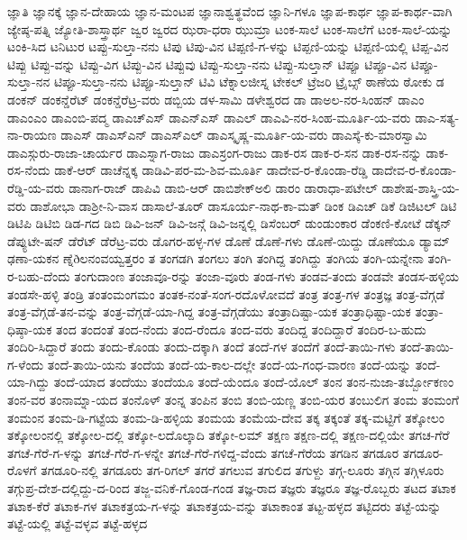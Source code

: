 ಜ್ಞಾತಿ
ಜ್ಞಾನಕ್ಕೆ
ಜ್ಞಾನ-ದೇಹಾಯ
ಜ್ಞಾನ-ಮಂಟಪ
ಜ್ಞಾನಾಶ್ವತ್ಥವೆಂದ
ಜ್ಞಾನಿ-ಗಳೂ
ಜ್ಞಾಪ-ಕಾರ್ಥ
ಜ್ಞಾಪ-ಕಾರ್ಥ-ವಾಗಿ
ಜ್ಯೇಷ್ಠ-ಪತ್ನಿ
ಜ್ಯೋತಿ-ಶಾಸ್ತ್ರಾರ್ಥ
ಜ್ವರ
ಜ್ವರದ
ಝರಾ-ಧರಾ
ಝುಮ್ರಾ
ಟಂಕ-ಸಾಲೆ
ಟಂಕ-ಸಾಲೆಗೆ
ಟಂಕ-ಸಾಲೆ-ಯನ್ನು
ಟಂಕಿ-ಸಿದ
ಟನಿಟುರ
ಟಪ್ಪು-ಸುಲ್ತಾ-ನನು
ಟಿಪು
ಟಿಪು-ವಿನ
ಟಿಪ್ಪಣಿ-ಗ-ಳನ್ನು
ಟಿಪ್ಪಣಿ-ಯನ್ನು
ಟಿಪ್ಪಣಿ-ಯಲ್ಲಿ
ಟಿಪ್ಪ-ವಿನ
ಟಿಪ್ಪು
ಟಿಪ್ಪು-ವನ್ನು
ಟಿಪ್ಪು-ವಿಗ
ಟಿಪ್ಪು-ವಿನ
ಟಿಪ್ಪುವು
ಟಿಪ್ಪು-ಸುಲ್ತಾ-ನನು
ಟಿಪ್ಪು-ಸುಲ್ತಾನ್
ಟಿಪ್ಪೂ
ಟಿಪ್ಪೂ-ವಿನ
ಟಿಪ್ಪೂ-ಸುಲ್ತಾ-ನನ
ಟಿಪ್ಪೂ-ಸುಲ್ತಾ-ನನು
ಟಿಪ್ಪೂ-ಸುಲ್ತಾನ್
ಟಿವಿ
ಟೆಕ್ನಾಲಜೀಸ್ನ
ಟೇಕಲ್
ಟ್ರೆಜರಿ
ಟ್ರೈಬ್ಸ್
ಠಾಣೆಯ
ಠೋಕು
ಡ
ಡಂಕನ್
ಡಂಕನ್ಡೆರೆಟ್
ಡಂಕನ್ಡೆರೆಟ್ರ-ವರು
ಡಬ್ಬಿಯ
ಡಳ-ಸಾಮಿ
ಡಳೇಶ್ವರದ
ಡಾ
ಡಾಅಲ-ನರ-ಸಿಂಹನ್
ಡಾಎಂ
ಡಾಎಂಎಂ
ಡಾಎಂಬಿ-ಪದ್ಮ
ಡಾಎಚ್ಎಸ್
ಡಾಎನ್ಎಸ್
ಡಾಎಲ್
ಡಾಎವಿ-ನರ-ಸಿಂಹ-ಮೂರ್ತಿ-ಯ-ವರು
ಡಾಎ-ಸತ್ಯ-ನಾ-ರಾಯಣ
ಡಾಎಸ್
ಡಾಎಸ್ಎನ್
ಡಾಎಸ್ಎಲ್
ಡಾಎಸ್ಕೃಷ್ಣ-ಮೂರ್ತಿ-ಯ-ವರು
ಡಾಎಸ್ಕೆ-ಕು-ಮಾರಸ್ವಾಮಿ
ಡಾಎಸ್ಗುರು-ರಾಜಾ-ಚಾರ್ಯರ
ಡಾಎಸ್ನಾಗ-ರಾಜು
ಡಾಎಸ್ರಂಗ-ರಾಜು
ಡಾಕ-ರಸ
ಡಾಕ-ರ-ಸನ
ಡಾಕ-ರಸ-ನನ್ನು
ಡಾಕ-ರಸ-ನೆಂದು
ಡಾಕೆ-ಆರ್
ಡಾಚೆನ್ನಕ್ಕ
ಡಾಡಿವಿ-ಪರ-ಮ-ಶಿವ-ಮೂರ್ತಿ
ಡಾದೇವ-ರ-ಕೊಂಡಾ-ರೆಡ್ಡಿ
ಡಾದೇವ-ರ-ಕೊಂಡಾ-ರೆಡ್ಡಿ-ಯ-ವರು
ಡಾನಾಗ-ರಾಜ್
ಡಾಪಿವಿ
ಡಾಬಿ-ಆರ್
ಡಾಬಿಶೇಕ್ಅಲಿ
ಡಾರಂ
ಡಾರಾಧಾ-ಪಟೇಲ್
ಡಾಶೇಷ-ಶಾಸ್ತ್ರಿ-ಯ-ವರು
ಡಾಶೋಭಾ
ಡಾಶ್ರೀ-ನಿ-ವಾಸ
ಡಾಸಾಲೆ-ತೂರ್
ಡಾಸೂರ್ಯ-ನಾಥ-ಕಾ-ಮತ್
ಡಿಂಕ
ಡಿಎಚ್
ಡಿಕೆ
ಡಿಜಿಟಲ್
ಡಿಟಿ
ಡಿಟಿಪಿ
ಡಿಟಿಬಿ
ಡಿಡ-ಗದ
ಡಿಬಿ
ಡಿವಿ-ಜನ್
ಡಿವಿ-ಜನ್ಗೆ
ಡಿವಿ-ಜನ್ನಲ್ಲಿ
ಡಿಸೆಂಬರ್
ಡುಂಡುಂಕಾರ
ಡೆಂಕಣಿ-ಕೋಟೆ
ಡೆಕ್ಕನ್
ಡೆಪ್ಯುಟೇ-ಷನ್
ಡೆರೆಟ್
ಡೆರೆಟ್ರ-ವರು
ಡೊಗರ-ಹಳ್ಳ-ಗಳ
ಡೊಣೆ
ಡೊಣೆ-ಗಳು
ಡೊಣೆ-ಯಿದ್ದು
ಡೊಣೆಯೂ
ಡ್ಯಾಮ್
ಢಣಾ-ಯಕನ
ಣ್ನೆðಲನಂವಯ್ವತ್ತರಂ
ತ
ತಂಗಡಗಿ
ತಂಗಲು
ತಂಗಿ
ತಂಗಿದ್ದ
ತಂಗಿದ್ದು
ತಂಗಿಯ
ತಂಗಿ-ಯನ್ನೇನಾ
ತಂಗಿ-ರ-ಬಹು-ದೆಂದು
ತಂಗುದಾಂಣ
ತಂಜಾವೂ-ರನ್ನು
ತಂಜಾ-ವೂರು
ತಂಡ-ಗಳು
ತಂಡವ-ತಂದು
ತಂಡವೇ
ತಂಡಸ-ಹಳ್ಳಿಯ
ತಂಡಸೇ-ಹಳ್ಳಿ
ತಂಡ್ರಿ
ತಂತಂಮಂಗಮಂ
ತಂತಕ-ನಂತೆ-ಸಂಗ-ರದೊಳೋವದೆ
ತಂತ್ರ
ತಂತ್ರ-ಗಳ
ತಂತ್ರಜ್ಞ
ತಂತ್ರ-ವೆಗ್ಗಡೆ
ತಂತ್ರ-ವೆಗ್ಗಡೆ-ತನ-ವನ್ನು
ತಂತ್ರ-ವೆಗ್ಗಡೆ-ಯಾ-ಗಿದ್ದ
ತಂತ್ರ-ವೆಗ್ಗಡೆಯು
ತಂತ್ರಾದಿಷ್ಟಾ-ಯಕ
ತಂತ್ರಾಧಿಷ್ಟಾ-ಯಕ
ತಂತ್ರಾ-ಧಿಷ್ಠಾ-ಯಕ
ತಂದ
ತಂದಂತೆ
ತಂದ-ನೆಂದು
ತಂದ-ರೆಂದೂ
ತಂದ-ವರು
ತಂದಿದ್ದ
ತಂದಿದ್ದಾರೆ
ತಂದಿರ-ಬ-ಹುದು
ತಂದಿರಿ-ಸಿದ್ದಾರೆ
ತಂದು
ತಂದು-ಕೊಂಡು
ತಂದು-ದಕ್ಕಾಗಿ
ತಂದೆ
ತಂದೆ-ಗಳ
ತಂದೆಗೆ
ತಂದೆ-ತಾಯಿ-ಗಳು
ತಂದೆ-ತಾಯಿ-ಗ-ಳೆಂದು
ತಂದೆ-ತಾಯಿ-ಯನು
ತಂದೆಯ
ತಂದೆ-ಯ-ಕಾಲ-ದಲ್ಲೇ
ತಂದೆ-ಯ-ಗಂಧ-ವಾರಣ
ತಂದೆ-ಯನ್ನು
ತಂದೆ-ಯಾ-ಗಿದ್ದು
ತಂದೆ-ಯಾದ
ತಂದೆಯು
ತಂದೆಯೂ
ತಂದೆ-ಯೆಂದೂ
ತಂದೆ-ಯೊಲ್
ತಂನ
ತಂನ-ನುಜಾ-ತರ್ಬ್ಬೋಕಣಂ
ತಂನ-ವರ
ತಂನಾಮ್ನಾ-ಯದ
ತಂನೊಳ್
ತಂನ್ನ
ತಂಪಿನ
ತಂಬಿ
ತಂಬಿ-ಯಣ್ಣ
ತಂಬಿ-ಯರ
ತಂಬುಲಿಗ
ತಂಮ
ತಂಮಂಗೆ
ತಂಮಂನ
ತಂಮ-ಡಿ-ಗಟ್ಟೆಯ
ತಂಮ-ಡಿ-ಹಳ್ಳಿಯ
ತಂಮಯ
ತಂಮೆಯ-ದೇವ
ತಕ್ಕ
ತಕ್ಕಂತೆ
ತಕ್ಕ-ಮಟ್ಟಿಗೆ
ತಕ್ಕೋಲಂ
ತಕ್ಕೋಲಂನಲ್ಲಿ
ತಕ್ಕೋಲ-ದಲ್ಲಿ
ತಕ್ಕೋ-ಲದೊಲ್ಕಾದಿ
ತಕ್ಕೋ-ಲಮ್
ತಕ್ಷಣ
ತಕ್ಷಣ-ದಲ್ಲಿ
ತಕ್ಷಣ-ದಲ್ಲಿಯೇ
ತಗಚ-ಗೆರೆ
ತಗಚೆ-ಗೆರೆ-ಗ-ಳನ್ನು
ತಗಚೆ-ಗೆರೆ-ಗ-ಳನ್ನೇ
ತಗಚೆ-ಗೆರೆ-ಗಳಿದ್ದ-ವೆಂದು
ತಗಚೆ-ಗೆರೆಯ
ತಗಡಿನ
ತಗಡೂರ
ತಗಡೂರ-ರೊಳಗೆ
ತಗಡೂರಿ-ನಲ್ಲಿ
ತಗಡೂರು
ತಗ-ರಿಗಲ್
ತಗರೆ
ತಗಲುವ
ತಗುಲಿದ
ತಗುಳ್ದು
ತಗ್ಗ-ಲೂರು
ತಗ್ಗಿನ
ತಗ್ಗಿಳೂರು
ತಗ್ಗುಪ್ರ-ದೇಶ-ದಲ್ಲಿದ್ದು-ದ-ರಿಂದ
ತಜ್ಜ-ವನಿಕೆ-ಗೊಂಡ-ಗಂಡ
ತಜ್ಞ-ರಾದ
ತಜ್ಞರು
ತಜ್ಞರೂ
ತಜ್ಞ-ರೊಬ್ಬರು
ತಟದ
ತಟಾಕ
ತಟಾಕ-ಕೆರೆ
ತಟಾಕ-ಗಳ
ತಟಾಕತ್ರಯ-ಗ-ಳನ್ನು
ತಟಾಕತ್ರಯ-ವನ್ನು
ತಟಾಕಾಂತ
ತಟ್ಟ-ಹಳ್ಳದ
ತಟ್ಟಿದರು
ತಟ್ಟೆ-ಯನ್ನು
ತಟ್ಟೆ-ಯಲ್ಲಿ
ತಟ್ಟೆ-ವಳ್ಳವ
ತಟ್ಟೆ-ಹಳ್ಳದ

